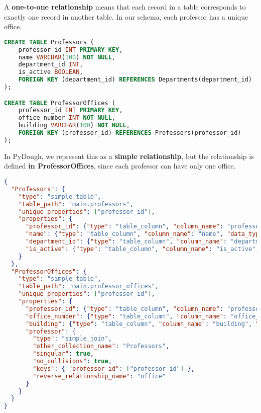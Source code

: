 \documentclass{article}
\begin{document}
A \textbf{one-to-one relationship} means that each record in a table corresponds to exactly one record in another table. In our schema, each professor has a unique office.


\begin{lstlisting}[language=SQL]
CREATE TABLE Professors (
    professor_id INT PRIMARY KEY,
    name VARCHAR(100) NOT NULL,
    department_id INT,
    is_active BOOLEAN,
    FOREIGN KEY (department_id) REFERENCES Departments(department_id)
);

CREATE TABLE ProfessorOffices (
    professor_id INT PRIMARY KEY,
    office_number INT NOT NULL,
    building VARCHAR(100) NOT NULL,
    FOREIGN KEY (professor_id) REFERENCES Professors(professor_id)
);
\end{lstlisting}

 
In PyDough, we represent this as a \textbf{simple relationship}, but the relationship is defined \textbf{in ProfessorOffices}, since each professor can have only one office.

\begin{lstlisting}[language=json]
{
  "Professors": {
    "type": "simple_table",
    "table_path": "main.professors",
    "unique_properties": ["professor_id"],
    "properties": {
      "professor_id": {"type": "table_column", "column_name": "professor_id", "data_type": "int32"},
      "name": {"type": "table_column", "column_name": "name", "data_type": "string"},
      "department_id": {"type": "table_column", "column_name": "department_id", "data_type": "int32"},
      "is_active": {"type": "table_column", "column_name": "is_active", "data_type": "boolean"}
    }
  },
  "ProfessorOffices": {
    "type": "simple_table",
    "table_path": "main.professor_offices",
    "unique_properties": ["professor_id"],
    "properties": {
      "professor_id": {"type": "table_column", "column_name": "professor_id", "data_type": "int32"},
      "office_number": {"type": "table_column", "column_name": "office_number", "data_type": "int32"},
      "building": {"type": "table_column", "column_name": "building", "data_type": "string"},
      "professor": {
        "type": "simple_join",
        "other_collection_name": "Professors",
        "singular": true,
        "no_collisions": true,
        "keys": { "professor_id": ["professor_id"] },
        "reverse_relationship_name": "office"
      }
    }
  }
}
\end{lstlisting}
\end{document}
